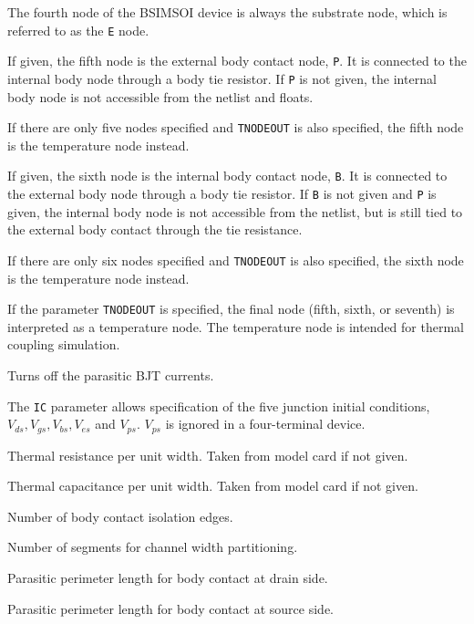 \begin{Device}
\begin{Parameters}

The fourth node of the BSIMSOI device is always the substrate node,
which is referred to as the \texttt{E} node. 


If given, the fifth node is the external body contact node,
\texttt{P}.  It is connected to the internal body node through a body
tie resistor.  If \texttt{P} is not given, the internal body node is
not accessible from the netlist and floats.

If there are only five nodes specified and \texttt{TNODEOUT} is also specified,
the fifth node is the temperature node instead.


If given, the sixth node is the internal body contact node, \texttt{B}.  It is
connected to the external body node through a body tie resistor.  If \texttt{B}
is not given and \texttt{P} is given, the internal body node is not accessible
from the netlist, but is still tied to the external body contact through the
tie resistance.

If there are only six nodes specified and \texttt{TNODEOUT} is also specified,
the sixth node is the temperature node instead.


If the parameter \texttt{TNODEOUT} is specified, the final node (fifth, sixth,
or seventh) is interpreted as a temperature node.  The temperature node is
intended for thermal coupling simulation.


Turns off the parasitic BJT currents.

The \texttt{IC} parameter allows specification of the five junction initial
conditions, $V_{ds}, V_{gs}, V_{bs}, V_{es}$ and $V_{ps}$.  $V_{ps}$ is ignored
in a four-terminal device.

Thermal resistance per unit width.  Taken from model card if not given.

Thermal capacitance per unit width.  Taken from model card if not given.

Number of body contact isolation edges.

Number of segments for channel width partitioning.

Parasitic perimeter length for body contact at drain side.

Parasitic perimeter length for body contact at source side.


\end{Parameters}
\end{Device}
